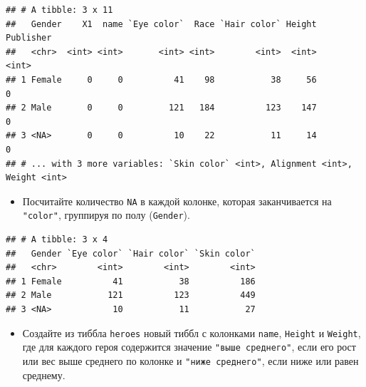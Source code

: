 \documentclass[]{book}
\newenvironment{Shaded}{\begin{snugshade}}{\end{snugshade}}
\newcommand{\KeywordTok}[1]{\textcolor[rgb]{0.13,0.29,0.53}{\textbf{#1}}}
\newcommand{\StringTok}[1]{\textcolor[rgb]{0.31,0.60,0.02}{#1}}
\newcommand{\ControlFlowTok}[1]{\textcolor[rgb]{0.13,0.29,0.53}{\textbf{#1}}}
\newcommand{\OperatorTok}[1]{\textcolor[rgb]{0.81,0.36,0.00}{\textbf{#1}}}
\newcommand{\NormalTok}[1]{#1}
\providecommand{\tightlist}{%
  \setlength{\itemsep}{0pt}\setlength{\parskip}{0pt}}
\begin{document}
\begin{verbatim}
## # A tibble: 3 x 11
##   Gender    X1  name `Eye color`  Race `Hair color` Height Publisher
##   <chr>  <int> <int>       <int> <int>        <int>  <int>     <int>
## 1 Female     0     0          41    98           38     56         0
## 2 Male       0     0         121   184          123    147         0
## 3 <NA>       0     0          10    22           11     14         0
## # ... with 3 more variables: `Skin color` <int>, Alignment <int>, Weight <int>
\end{verbatim}

\begin{itemize}
\tightlist
\item
  Посчитайте количество \texttt{NA} в каждой колонке, которая
  заканчивается на \texttt{"color"}, группируя по полу
  (\texttt{Gender}).
\end{itemize}

\begin{Shaded}
\end{Shaded}

\begin{verbatim}
## # A tibble: 3 x 4
##   Gender `Eye color` `Hair color` `Skin color`
##   <chr>        <int>        <int>        <int>
## 1 Female          41           38          186
## 2 Male           121          123          449
## 3 <NA>            10           11           27
\end{verbatim}

\begin{itemize}
\tightlist
\item
  Создайте из тиббла \texttt{heroes} новый тиббл с колонками
  \texttt{name}, \texttt{Height} и \texttt{Weight}, где для каждого
  героя содержится значение \texttt{"выше\ среднего"}, если его рост или
  вес выше среднего по колонке и \texttt{"ниже\ среднего"}, если ниже
  или равен среднему.
\end{itemize}
\end{document}

